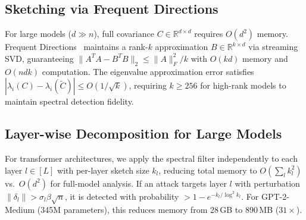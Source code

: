 \subsection{Sketching via Frequent Directions}

For large models ($d \gg n$), full covariance $C \in \mathbb{R}^{d \times d}$ requires $O(d^2)$ memory.
Frequent Directions~\cite{frequent_directions} maintains a rank-$k$ approximation $B \in \mathbb{R}^{k \times d}$
via streaming SVD, guaranteeing $\|A^TA - B^TB\|_2 \leq \|A\|_F^2/k$ with $O(kd)$ memory and
$O(ndk)$ computation.
The eigenvalue approximation error satisfies $|\lambda_i(C) - \lambda_i(\tilde{C})| \leq O(1/\sqrt{k})$,
requiring $k \geq 256$ for high-rank models to maintain spectral detection fidelity.

\subsection{Layer-wise Decomposition for Large Models}

For transformer architectures, we apply the spectral filter independently to each layer $l \in [L]$
with per-layer sketch size $k_l$, reducing total memory to $O(\sum_l k_l^2)$ vs.\ $O(d^2)$ for
full-model analysis.
If an attack targets layer $l$ with perturbation $\|\delta_l\| > \sigma_l\beta\sqrt{n}$, it is detected
with probability $> 1 - e^{-k_l/\log^2 k_l}$.
For GPT-2-Medium (345M parameters), this reduces memory from 28\,GB to 890\,MB ($31\times$).
